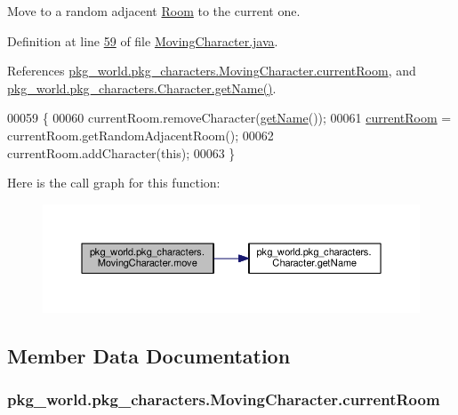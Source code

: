Move to a random adjacent \hyperlink{classpkg__world_1_1Room}{Room} to the current one. 



Definition at line \hyperlink{MovingCharacter_8java_source_l00059}{59} of file \hyperlink{MovingCharacter_8java_source}{Moving\-Character.\-java}.



References \hyperlink{MovingCharacter_8java_source_l00016}{pkg\-\_\-world.\-pkg\-\_\-characters.\-Moving\-Character.\-current\-Room}, and \hyperlink{Character_8java_source_l00127}{pkg\-\_\-world.\-pkg\-\_\-characters.\-Character.\-get\-Name()}.


\begin{DoxyCode}
00059                        \{
00060         currentRoom.removeCharacter(\hyperlink{classpkg__world_1_1pkg__characters_1_1Character_a660097e198e2e62f83d83a8872eb55d1}{getName}());
00061         \hyperlink{classpkg__world_1_1pkg__characters_1_1MovingCharacter_abef44df79f5b66a48f5bacc6e0f29c54}{currentRoom} = currentRoom.getRandomAdjacentRoom();
00062         currentRoom.addCharacter(\textcolor{keyword}{this});
00063     \}
\end{DoxyCode}


Here is the call graph for this function\-:
\nopagebreak
\begin{figure}[H]
\begin{center}
\leavevmode
\includegraphics[width=350pt]{classpkg__world_1_1pkg__characters_1_1MovingCharacter_aaf4df04191a12b44ecf4d5e127c3a969_cgraph}
\end{center}
\end{figure}




\subsection{Member Data Documentation}
\hypertarget{classpkg__world_1_1pkg__characters_1_1MovingCharacter_abef44df79f5b66a48f5bacc6e0f29c54}{
\subsubsection[{current\-Room}]{ pkg\-\_\-world.\-pkg\-\_\-characters.\-Moving\-Character.\-current\-Room\hspace{0.3cm}{\ttfamily [private]}}}\label{classpkg__world_1_1pkg__characters_1_1MovingCharacter_abef44df79f5b66a48f5bacc6e0f29c54}


